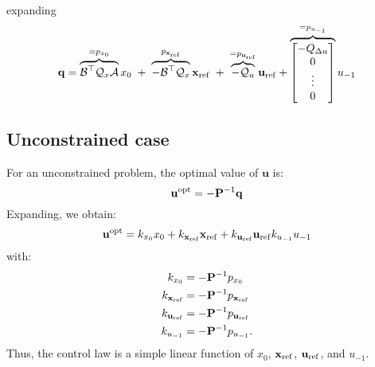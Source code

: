 \documentclass[a4paper,12pt,fleqn]{article}
\newcommand{\PQP}{\mathbf{P}}
\newcommand{\qQP}{\mathbf{q}}
\newcommand{\varxvec}{\mathbf{x}}
\newcommand{\varuvec}{\mathbf{u}}
\newcommand{\baru}{u_{-1}}
\begin{document}
expanding
\begin{equation}
 \qQP = \overbrace{\mathcal{B}^\top \mathcal{Q}_x\mathcal{A}}^{=p_{x_0}}x_0  \;+\; \overbrace{-\mathcal{B}^\top \mathcal{Q}_x}^{p_{\varxvec_{\rm ref}}}\varxvec_{\rm ref}\;+\; \overbrace{-\mathcal{Q}_u}^{=p_{\varuvec_{\rm ref}}}\varuvec_{\rm ref} + 
\overbrace{
  \begin{bmatrix}
 -Q_{\Delta u} \\ 0 \\ \vdots \\0
 \end{bmatrix}
}^{=p_{\baru}}
\baru
\end{equation}
\subsection{Unconstrained case}
For an unconstrained problem, the optimal value of $\varuvec$ is:
\begin{equation}
 \varuvec^{\rm opt} = -\PQP^{-1}\qQP
\end{equation}
Expanding, we obtain:
\begin{equation}
 \varuvec^{\rm opt} = k_{x_0} x_0 + k_{\varxvec_{\rm ref}}\varxvec_{\rm ref} + k_{\varuvec_{\rm ref}} \varuvec_{\rm ref} k_{\baru} \baru
\end{equation}
with:
\begin{subequations}
\begin{align}
k_{x_0} &= -\PQP^{-1}p_{x_0}\\
k_{\varxvec_{\rm ref}} &= -\PQP^{-1}p_{\varxvec_{\rm ref}}\\
k_{\varuvec_{\rm ref}} &= -\PQP^{-1}p_{\varuvec_{\rm ref}}\\
k_{\baru} &= -\PQP^{-1}p_{\baru}.
\end{align}
\end{subequations}
Thus, the control law is a simple linear function of $x_0$, $\varxvec_{\rm ref}$, $\varuvec_{\rm ref}$, and $u_{-1}$.
\end{document}
